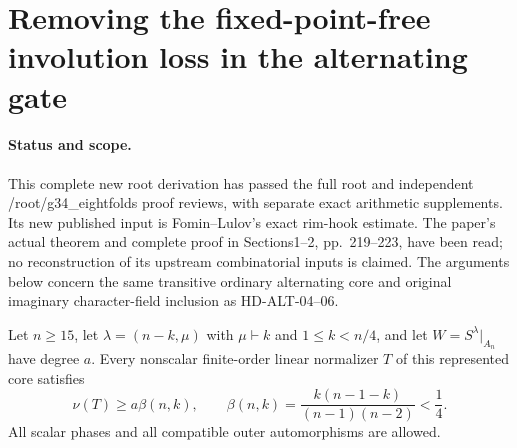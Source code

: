 \section{Removing the fixed-point-free involution loss in the alternating gate}
\label{sec:ordinary-alternating-fixed-free}

\paragraph{Status and scope.}
This complete new root derivation has passed the full root and
independent /root/g34\_eightfolds proof reviews, with separate exact
arithmetic supplements. Its new published input is Fomin--Lulov's exact
rim-hook estimate. The paper's actual theorem and complete proof in
Sections1--2, pp.~219--223, have been read; no reconstruction of its
upstream combinatorial inputs is claimed. The arguments below concern
the same transitive ordinary alternating core and original imaginary
character-field inclusion as HD-ALT-04--06.

\begin{lemma}
\label{HD-ALT-07a}
Let $n\ge15$, let $\lambda=(n-k,\mu)$ with $\mu\vdash k$ and
$1\le k<n/4$, and let $W=S^\lambda|_{A_n}$ have degree $a$.
Every nonscalar finite-order linear normalizer $T$ of this represented
core satisfies
\[
 \nu(T)\ge a\beta(n,k),\qquad
 \beta(n,k)=\frac{k(n-1-k)}{(n-1)(n-2)}<\frac14.
 \tag{ALTFF.1}
\]
All scalar phases and all compatible outer automorphisms are allowed.
\end{lemma}

